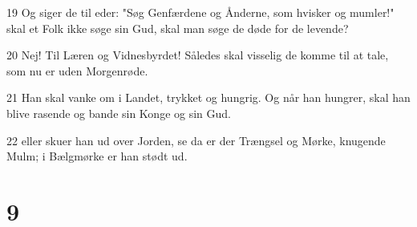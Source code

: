 \par 19 Og siger de til eder: "Søg Genfærdene og Ånderne, som hvisker og mumler!" skal et Folk ikke søge sin Gud, skal man søge de døde for de levende?
\par 20 Nej! Til Læren og Vidnesbyrdet! Således skal visselig de komme til at tale, som nu er uden Morgenrøde.
\par 21 Han skal vanke om i Landet, trykket og hungrig. Og når han hungrer, skal han blive rasende og bande sin Konge og sin Gud.
\par 22 eller skuer han ud over Jorden, se da er der Trængsel og Mørke, knugende Mulm; i Bælgmørke er han stødt ud.

\chapter{9}

